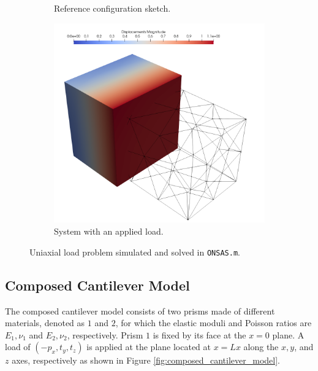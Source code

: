\documentclass[oneside,a4paper,english,links]{amca}
\begin{document}
\begin{figure}[ht]
	\centering
	\begin{subfigure}[b]{0.48\textwidth}
	\def\svgwidth{\textwidth}
	
	\caption{Reference configuration sketch.}
	\end{subfigure}
	\hfill
	\begin{subfigure}[b]{0.48\textwidth}
	\centering
		\includegraphics[width=\textwidth]{Figures/Example1.png}
	\caption{System with an applied load.}
	\end{subfigure}
	\caption{Uniaxial load problem simulated and solved in \texttt{ONSAS.m}.}
	\label{fig:uniaxial_model}
\end{figure}


\subsection{Composed Cantilever Model}
The composed cantilever model consists of two prisms made of different materials, denoted as $1$ and $2$, for which the elastic moduli and Poisson ratios are $E_1, \nu_1$ and $E_2, \nu_2$, respectively. Prism $1$ is fixed by its face at the $x=0$ plane. A load of $(-p_x, t_y, t_z)$ is applied at the plane located at $x=Lx$ along the $x, y$, and $z$ axes, respectively as shown in Figure \ref{fig:composed_cantilever_model}.
\end{document}
